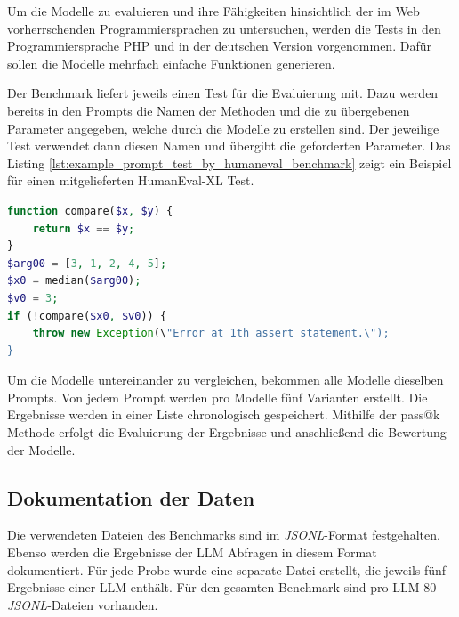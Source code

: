 Um die Modelle zu evaluieren und ihre Fähigkeiten hinsichtlich der im Web vorherrschenden Programmiersprachen zu untersuchen, werden die Tests in den Programmiersprache PHP und in der deutschen Version vorgenommen. Dafür sollen die Modelle mehrfach einfache Funktionen generieren.\vspace{0.2cm}

Der Benchmark liefert jeweils einen Test für die Evaluierung mit. Dazu werden bereits in den Prompts die Namen der Methoden und die zu übergebenen Parameter angegeben, welche durch die Modelle zu erstellen sind. Der jeweilige Test verwendet dann diesen Namen und übergibt die geforderten Parameter. Das Listing \ref{lst:example_prompt_test_by_humaneval_benchmark} zeigt ein Beispiel für einen mitgelieferten HumanEval-XL Test.\vspace{0.2cm}

\begin{lstlisting}[language=php,caption={Beispiel für einen Test aus dem HumanEval-XL Benchmark},label=lst:example_prompt_test_by_humaneval_benchmark]
function compare($x, $y) {
	return $x == $y;
}
$arg00 = [3, 1, 2, 4, 5];
$x0 = median($arg00);
$v0 = 3;
if (!compare($x0, $v0)) {
	throw new Exception(\"Error at 1th assert statement.\");
}
\end{lstlisting}


Um die Modelle untereinander zu vergleichen, bekommen alle Modelle dieselben Prompts. Von jedem Prompt werden pro Modelle fünf Varianten erstellt. Die Ergebnisse werden in einer Liste chronologisch gespeichert. Mithilfe der pass@k Methode erfolgt die Evaluierung der Ergebnisse und anschließend die Bewertung der Modelle.

\subsection{Dokumentation der Daten}
Die verwendeten Dateien des Benchmarks sind im \textit{JSONL}-Format festgehalten. Ebenso werden die Ergebnisse der LLM Abfragen in diesem Format dokumentiert. Für jede Probe wurde eine separate Datei erstellt, die jeweils fünf Ergebnisse einer LLM enthält. Für den gesamten Benchmark sind pro LLM 80 \textit{JSONL}-Dateien vorhanden.\vspace{0.2cm}

